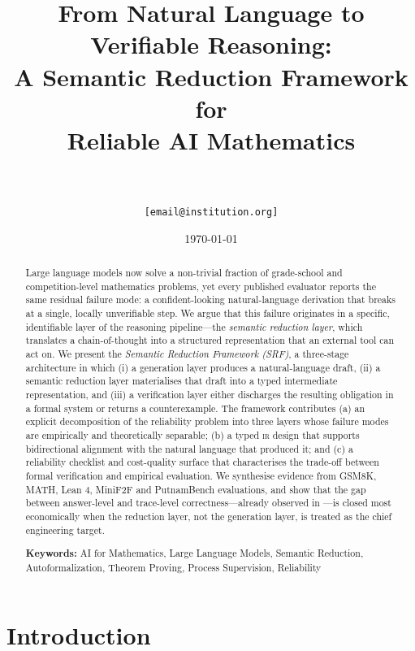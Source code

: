 \documentclass[11pt,a4paper]{article}
\title{\bfseries
  From Natural Language to Verifiable Reasoning:\\[0.25em]
  A Semantic Reduction Framework for\\Reliable AI Mathematics}
\author{
  {\normalfont [Author Name]}\\
  {\normalfont [Affiliation]}\\
  {\normalfont \texttt{[email@institution.org]}}
}
\date{\today}
\newcommand{\IR}{\textsc{ir}}
\begin{document}
\maketitle
\thispagestyle{empty}

\begin{abstract}
Large language models now solve a non-trivial fraction of grade-school
and competition-level mathematics problems, yet every published
evaluator reports the same residual failure mode: a confident-looking
natural-language derivation that breaks at a single, locally
unverifiable step.  We argue that this failure originates in a
specific, identifiable layer of the reasoning pipeline---the
\emph{semantic reduction layer}, which translates a chain-of-thought
into a structured representation that an external tool can act on.
We present the \emph{Semantic Reduction Framework (SRF)}, a
three-stage architecture in which (i) a generation layer produces a
natural-language draft, (ii) a semantic reduction layer materialises
that draft into a typed intermediate representation, and (iii) a
verification layer either discharges the resulting obligation in a
formal system or returns a counterexample.  The framework
contributes (a) an explicit decomposition of the reliability problem
into three layers whose failure modes are empirically and
theoretically separable; (b) a typed \IR{} design that supports
bidirectional alignment with the natural language that produced it;
and (c) a reliability checklist and cost-quality surface that
characterises the trade-off between formal verification and
empirical evaluation.  We synthesise evidence from GSM8K, MATH, Lean
4, MiniF2F and PutnamBench evaluations, and show that the gap
between answer-level and trace-level correctness---already observed in
\citet{lightman2023letsverify}---is closed most economically when
the reduction layer, not the generation layer, is treated as the
chief engineering target.

\bigskip\noindent\textbf{Keywords:} AI for Mathematics, Large
Language Models, Semantic Reduction, Autoformalization, Theorem
Proving, Process Supervision, Reliability
\end{abstract}

\section{Introduction}
\label{sec:intro}
\end{document}
